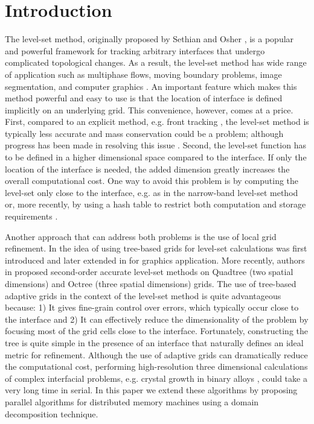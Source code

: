 \section{Introduction}\label{sec:introduction}
The level-set method, originally proposed by Sethian and Osher \cite{Osher;Sethian:88:Fronts-Propagating-w}, is a popular and powerful framework for tracking arbitrary interfaces that undergo complicated topological changes. As a result, the level-set method has wide range of application such as multiphase flows, moving boundary problems, image segmentation, and computer graphics \cite{Osher;Fedkiw:01:Level-Set-Methods:-A,Sethian:99:Level-set-methods-an}. An important feature which makes this method powerful and easy to use is that the location of interface is defined implicitly on an underlying grid. This convenience, however, comes at a price. First, compared to an explicit method, e.g. front tracking \cite{Juric:96:A-Front-Tracking-Met, Tryggvason;Bunner;Esmaeeli;etal:01:A-Front-Tracking-Met}, the level-set method is typically less accurate and mass conservation could be a problem; although progress has been made in resolving this issue \cite{Enright;Fedkiw;Ferziger;etal:02:A-Hybrid-Particle-Le}. Second, the level-set function has to be defined in a higher dimensional space compared to the interface. If only the location of the interface is needed, the added dimension greatly increases the overall computational cost. One way to avoid this problem is by computing the level-set only close to the interface, e.g. as in the narrow-band level-set method \cite{Adalsteinsson;Sethian:95:A-Fast-Level-Set-Met} or, more recently, by using a hash table to restrict both computation and storage requirements \cite{Brun;Guittet;Gibou:12:A-local-level-set-me}.

Another approach that can address both problems is the use of local grid refinement. In \cite{Strain:99:Tree-Methods-for-Mov} the idea of using tree-based grids for level-set calculations was first introduced and later extended in \cite{Losasso;Gibou;Fedkiw:04:Simulating-Water-and} for graphics application. More recently, authors in \cite{Min;Gibou:07:A-second-order-accur} proposed second-order accurate level-set methods on Quadtree (two spatial dimensions) and Octree (three spatial dimensions) grids. The use of tree-based adaptive grids in the context of the level-set method is quite advantageous because: 1) It gives fine-grain control over errors, which typically occur close to the interface and 2) It can effectively reduce the dimensionality of the problem by focusing most of the grid cells close to the interface. Fortunately, constructing the tree is quite simple in the presence of an interface that naturally defines an ideal metric for refinement. Although the use of adaptive grids can dramatically reduce the computational cost, performing high-resolution three dimensional calculations of complex interfacial problems, e.g. crystal growth in binary alloys \cite{Theillard;Gibou;Pollock:14:A-Sharp-Computationa}, could take a very long time in serial. In this paper we extend these algorithms by proposing parallel algorithms for distributed memory machines using a domain decomposition technique.

